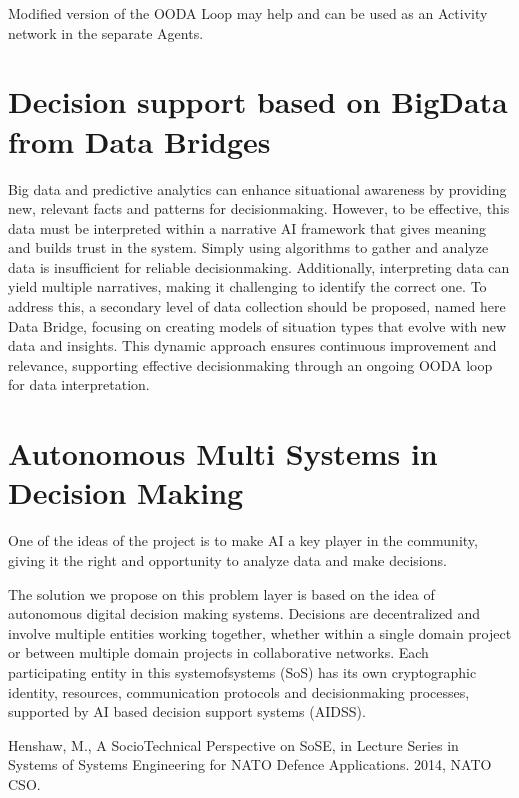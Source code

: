 \documentclass[a4paper,12pt,english]{sphinxmanual}
\begin{document}
\sphinxAtStartPar
Modified version of the OODA Loop may help and can be used as an
Activity network in the separate Agents.


\chapter{Decision support based on BigData from Data Bridges}
\label{\detokenize{index:decision-support-based-on-bigdata-from-data-bridges}}
\sphinxAtStartPar
Big data and predictive analytics can enhance situational awareness by
providing new, relevant facts and patterns for decision\sphinxhyphen{}making. However,
to be effective, this data must be interpreted within a narrative AI
framework that gives meaning and builds trust in the system. Simply
using algorithms to gather and analyze data is insufficient for reliable
decision\sphinxhyphen{}making. Additionally, interpreting data can yield multiple
narratives, making it challenging to identify the correct one. To
address this, a secondary level of data collection should be proposed,
named here Data Bridge, focusing on creating models of situation types
that evolve with new data and insights. This dynamic approach ensures
continuous improvement and relevance, supporting effective
decision\sphinxhyphen{}making through an ongoing OODA loop for data interpretation.


\chapter{Autonomous Multi Systems in Decision Making}
\label{\detokenize{index:autonomous-multi-systems-in-decision-making}}
\sphinxAtStartPar
One of the ideas of the project is to make AI a key player in the
community, giving it the right and opportunity to analyze data and make
decisions.

\sphinxAtStartPar
The solution we propose on this problem layer is based on the idea of
autonomous digital decision making systems. Decisions are decentralized
and involve multiple entities working together, whether within a single
domain project or between multiple domain projects in collaborative
networks. Each participating entity in this system\sphinxhyphen{}of\sphinxhyphen{}systems (SoS)
has its own cryptographic identity, resources, communication
protocols and decision\sphinxhyphen{}making processes, supported by AI based decision
support systems (AI\sphinxhyphen{}DSS). %
\begin{footnote}[11]\sphinxAtStartFootnote
Henshaw, M., A Socio\sphinxhyphen{}Technical Perspective on SoSE, in Lecture Series
in Systems of Systems Engineering for NATO Defence Applications. 2014, NATO CSO.
%
\end{footnote}
\end{document}
